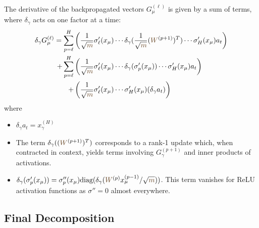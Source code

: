 \documentclass[a4paper]{article}
\newcommand{\W}{\textcolor{weightcolor}{W}}
\newcommand{\m}{\textcolor{weightcolor}{m}}
\theoremstyle{plain}
\theoremstyle{definition}
\theoremstyle{remark}
\begin{document}
The derivative of the backpropagated vectors $G^{(\ell)}_\mu$ is given by a sum of terms, where $\delta_\gamma$ acts on one factor at a time:
\begin{align}
\delta_\gamma G^{(\ell)}_\mu = \sum_{p=\ell}^{H} & \left( \frac{1}{\sqrt{\m}}\sigma'_\ell(x_\mu) \cdots \delta_\gamma(\frac{1}{\sqrt{\m}}(\W^{(p+1)})^T) \cdots \sigma'_H(x_\mu) a_t \right) \\
+ \sum_{p=\ell}^{H} & \left( \frac{1}{\sqrt{\m}}\sigma'_\ell(x_\mu) \cdots \delta_\gamma(\sigma'_{p}(x_\mu)) \cdots \sigma'_H(x_\mu) a_t \right) \\
+ & \left( \frac{1}{\sqrt{\m}}\sigma'_\ell(x_\mu) \cdots \sigma'_H(x_\mu) (\delta_\gamma a_t) \right)
\end{align}
where
\begin{itemize}
    \item $\delta_\gamma a_t = x^{(H)}_\gamma$
    \item The term $\delta_\gamma((\W^{(p+1)})^T)$ corresponds to a rank-1 update which, when contracted in context, yields terms involving $G^{(p+1)}_\gamma$ and inner products of activations.
    \item $\delta_\gamma(\sigma'_{p}(x_\mu)) = \sigma''_{p}(x_\mu) \text{diag}(\delta_\gamma(\W^{(p)}x^{(p-1)}_\mu/\sqrt{\m}))$. This term vanishes for ReLU activation functions as $\sigma''=0$ almost everywhere.
\end{itemize}




\subsection{Final Decomposition}
\end{document}
